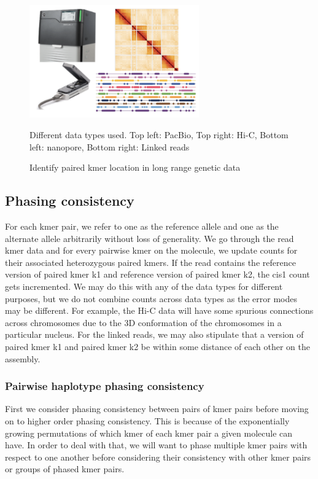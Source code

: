 \begin{figure}[htbp!]
\caption{Identify paired kmer location in long range genetic data}
\label{figure:techs}
\begin{centering}
\includegraphics[width=0.65\textwidth]{techs.png}
\par{Different data types used. Top left: PacBio, Top right: Hi-C, Bottom left: nanopore, Bottom right: Linked reads}
\end{centering}
\end{figure}
\subsection{Phasing consistency}
\par{
For each kmer pair, we refer to one as the reference allele and one as the alternate allele arbitrarily without loss of generality. We go through the read kmer data and for every pairwise kmer on the molecule, we update counts for their associated heterozygous paired kmers. If the read contains the reference version of paired kmer k1 and reference version of paired kmer k2, the cis1 count gets incremented. We may do this with any of the data types for different purposes, but we do not combine counts across data types as the error modes may be different. For example, the Hi-C data will have some spurious connections across chromosomes due to the 3D conformation of the chromosomes in a particular nucleus. For the linked reads, we may also stipulate that a version of paired kmer k1 and paired kmer k2 be within some distance of each other on the assembly.
}
\subsubsection{Pairwise haplotype phasing consistency}
\par{
First we consider phasing consistency between pairs of kmer pairs before moving on to higher order phasing consistency. This is because of the exponentially growing permutations of which kmer of each kmer pair a given molecule can have. In order to deal with that, we will want to phase multiple kmer pairs with respect to one another before considering their consistency with other kmer pairs or groups of phased kmer pairs.
}


